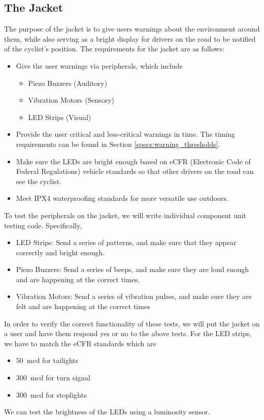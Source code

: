 \documentclass[journal]{IEEEtran}
\begin{document}
\subsection{The Jacket}
The purpose of the jacket is to give users warnings about the environment around them, while also serving as a bright display for drivers on the road to be notified of the cyclist's position. The requirements for the jacket are as follows:
\begin{itemize}
  \item Give the user warnings via peripherals, which include
  \begin{itemize}
    \item Piezo Buzzers (Auditory)
    \item Vibration Motors (Sensory)
    \item LED Strips (Visual)
  \end{itemize}
  \item Provide the user critical and less-critical warnings in time. The timing requirements can be found in Section \ref{specs:warning_thresholds}.
  \item Make sure the LEDs are bright enough based on eCFR (Electronic Code of Federal Regulations) vehicle standards so that other drivers on the road can see the cyclist.
  \item Meet IPX4 waterproofing standards for more versatile use outdoors.
\end{itemize}

To test the peripherals on the jacket, we will write individual component unit testing code.
Specifically,
\begin{itemize}
    \item LED Strips: Send a series of patterns, and make sure that they appear correctly and bright enough.
    \item Piezo Buzzers: Send a series of beeps, and make sure they are loud enough and are happening at the correct times. 
    \item Vibration Motors: Send a series of vibration pulses, and make sure they are felt and are happening at the correct times
\end{itemize}
In order to verify the correct functionality of these tests, we will put the jacket on a user and have them respond yes or no to the above tests. For the LED strips, we have to match the eCFR standards\cite{light-brightness} which are
\begin{itemize}
    \item \SI{50}{\milli\candela} for tailights
    \item \SI{300}{\milli\candela} for turn signal
    \item \SI{300}{\milli\candela} for stoplights
\end{itemize}
We can test the brightness of the LEDs using a luminosity sensor.
\end{document}
